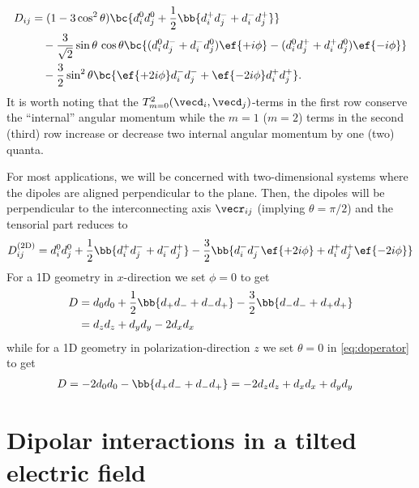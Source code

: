\begin{align}\label{eq:doperator}
    D_{ij} &= (1-3\cos^2 \theta) \bc{ d_i^0 d_j^0 + \frac{1}{2}\bb{d_i^+ d_j^- + d_i^- d_j^+} } \\
           &\quad -\frac{3}{\sqrt{2}}\sin\theta \,\cos\theta \bc{ (d_i^0 d_j^- + d_i^- d_j^0) \ef{+i\phi} - (d_i^0 d_j^+ + d_i^+ d_j^0) \ef{-i\phi} } \\
           &\quad -\frac{3}{2}\sin^2\theta \bc{ \ef{+2i\phi} d_i^- d_j^- + \ef{-2i\phi} d_i^+ d_j^+ }.
\end{align}
It is worth noting that the $T^2_{m=0}(\vecd_i, \vecd_j)$-terms in the first row conserve the ``internal'' angular momentum while the $m=1$ ($m=2$) terms in the second (third) row increase or decrease two internal angular momentum by one (two) quanta.

For most applications, we will be concerned with two-dimensional systems where the dipoles are aligned perpendicular to the plane. Then, the dipoles will be perpendicular to the interconnecting axis $\vecr_{ij}$ (implying $\theta = \pi/2$) and the tensorial part reduces to
\begin{align}
    D^\text{(2D)}_{ij} = d_i^0 d_j^0 + \frac{1}{2}\bb{d_i^+ d_j^- + d_i^- d_j^+} -\frac{3}{2} \bb{ d_i^- d_j^- \ef{+2i\phi} + d_i^+ d_j^+ \ef{-2i\phi} }
\end{align}
For a 1D geometry in $x$-direction we set $\phi=0$ to get
\begin{align}
D &= d_0 d_0 + \frac{1}{2}\bb{d_+ d_- + d_- d_+} -\frac{3}{2} \bb{d_- d_- + d_+ d_+}\\
 &= d_z d_z + d_y d_y - 2 d_x d_x
\end{align}
while for a 1D geometry in polarization-direction $z$ we set $\theta=0$ in \eqref{eq:doperator} to get
\begin{align}
D &= -2 d_0 d_0 - \bb{d_+ d_- + d_- d_+} = -2 d_z d_z+ d_x d_x + d_y d_y
\end{align}

\section{Dipolar interactions in a tilted electric field}

